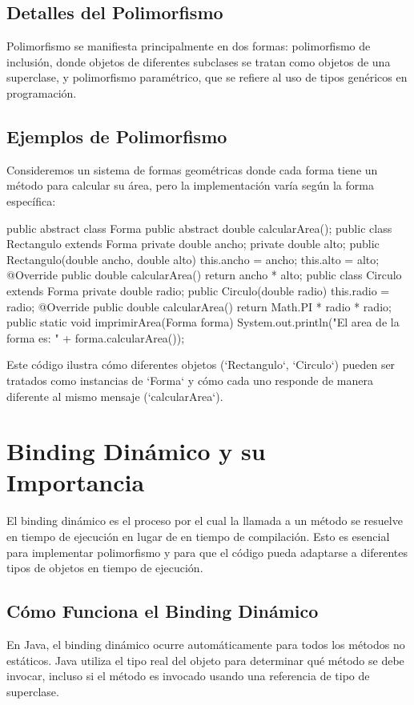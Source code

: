 \documentclass[a4paper]{report}
\begin{document}
\subsection{Detalles del Polimorfismo}
Polimorfismo se manifiesta principalmente en dos formas: polimorfismo de inclusión, donde objetos de diferentes subclases se tratan como objetos de una superclase, y polimorfismo paramétrico, que se refiere al uso de tipos genéricos en programación.

\subsection{Ejemplos de Polimorfismo}
Consideremos un sistema de formas geométricas donde cada forma tiene un método para calcular su área, pero la implementación varía según la forma específica:

\begin{roundedlst}
public abstract class Forma {
    public abstract double calcularArea();
}
public class Rectangulo extends Forma {
    private double ancho;
    private double alto;
    public Rectangulo(double ancho, double alto) {
        this.ancho = ancho;
        this.alto = alto;
    }
    @Override
    public double calcularArea() {
        return ancho * alto;
    }
}
public class Circulo extends Forma {
    private double radio;
    public Circulo(double radio) {
        this.radio = radio;
    }
    @Override
    public double calcularArea() {
        return Math.PI * radio * radio;
    }
}
public static void imprimirArea(Forma forma) {
    System.out.println("El area de la forma es: " 
                       + forma.calcularArea());
}
\end{roundedlst}

Este código ilustra cómo diferentes objetos (`Rectangulo`, `Circulo`) pueden ser tratados como instancias de `Forma` y cómo cada uno responde de manera diferente al mismo mensaje (`calcularArea`).

\section{Binding Dinámico y su Importancia}
El binding dinámico es el proceso por el cual la llamada a un método se resuelve en tiempo de ejecución en lugar de en tiempo de compilación. Esto es esencial para implementar polimorfismo y para que el código pueda adaptarse a diferentes tipos de objetos en tiempo de ejecución.

\subsection{Cómo Funciona el Binding Dinámico}
En Java, el binding dinámico ocurre automáticamente para todos los métodos no estáticos. Java utiliza el tipo real del objeto para determinar qué método se debe invocar, incluso si el método es invocado usando una referencia de tipo de superclase.
\end{document}
